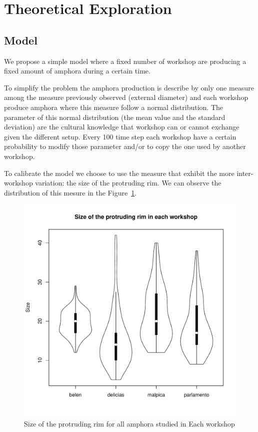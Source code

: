 \documentclass[a4paper]{article}
\begin{document}
\section{Theoretical Exploration}
\subsection{Model}
We propose a simple model where a fixed number of workshop are producing a fixed amount of amphora during a certain time. 

To simplify the problem the amphora production is describe by only one measure among the measure previously observed (external diameter) and each workshop produce amphora where this measure follow a normal distribution. The parameter of this normal distribution (the mean value and the standard deviation) are the cultural knowledge that workshop can or cannot exchange given the different setup. Every 100 time step each workshop have a certain probability to modify those parameter and/or to copy the one used by another workshop. 

To calibrate the model we choose to use the measure that exhibit the more inter-workshop variation: the size of the protruding rim. We can observe the distribution of this mesure in the Figure~\ref{fig:prot}.
\begin{figure}[h!]
    \begin{center}
	\includegraphics[width=0.6\linewidth]{images/prot.pdf}
    \end{center}
    \caption{Size of the protruding rim for all amphora studied in Each workshop}
    \label{fig:prot}
\end{figure}
\end{document}
